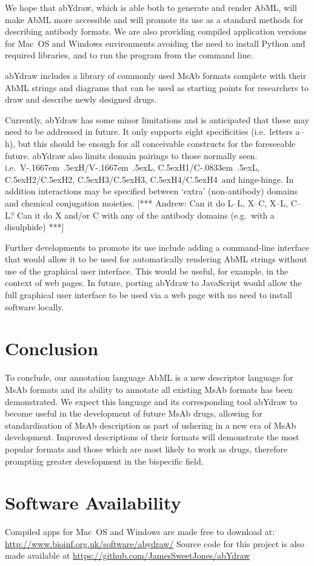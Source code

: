 \documentclass[a4]{article}
\newcommand{\VH}{\mbox{V\kern-.1667em \lower.5ex\hbox{\scriptsize H}}}
\newcommand{\VL}{\mbox{V\kern-.1667em \lower.5ex\hbox{\scriptsize L}}}
\newcommand{\VHVL}{\mbox{\VH/\VL}}
\newcommand{\CH}[1]{\mbox{C\lower.5ex\hbox{\scriptsize H}#1}}
\newcommand{\CL}{\mbox{C\kern-.0833em \lower.5ex\hbox{\scriptsize L}}}
\newcommand{\andrew}[1]{{\color{red} [*** Andrew: #1 ***]}}
\begin{document}
We hope that abYdraw, which is able both to generate and render AbML,
will make AbML more accessible and will promote its use as a standard
methods for describing antibody formats.  We are also providing
compiled application versions for Mac~OS and Windows environments
avoiding the need to install Python and required libraries, and to run
the program from the command line.

abYdraw includes a library of commonly used MsAb formats complete with their AbML
strings and diagrams that can be used as starting points for
researchers to draw and describe newly designed drugs.

Currently, abYdraw has some minor limitations and is anticipated that
these may need to be addressed in future. It only supports eight
specificities (i.e.\ letters a--h), but this should be enough for all
conceivable constructs for the foreseeable future.  abYdraw also
limits domain pairings to those normally seen. i.e.\ \VHVL,
\CH{1}/\CL, \CH{2}/\CH{2}, \CH{3}/\CH{3}, \CH{4}/\CH{4}\ and
hinge-hinge. In addition interactions may be specified between `extra'
(non-antibody) domains and chemical conjugation moieties.  \andrew{Can
  it do L--L, X--C, X--L, C--L? Can it do X and/or C with any of the
  antibody domains (e.g.\ with a disulphide)}

Further developments to promote its use include adding a command-line
interface that would allow it to be used for automatically rendering
AbML strings without use of the graphical user interface. This would
be useful, for example, in the context of web pages. In future,
porting abYdraw to JavaScript would allow the full graphical user
interface to be used via a web page with no need to install software
locally.


\section{Conclusion}

To conclude, our annotation language AbML is a new descriptor language
for MsAb formats and its ability to annotate all existing MsAb formats
has been demonstrated. We expect this language and its corresponding
tool abYdraw to become useful in the development of future MsAb drugs,
allowing for standardisation of MsAb description as part of ushering
in a new era of MsAb development. Improved descriptions of their
formats will demonstrate the most popular formats and those which are
most likely to work as drugs, therefore prompting greater development
in the bispecific field.  

\section{Software Availability}
Compiled apps for Mac~OS and Windows are made free to download at:
\url{http://www.bioinf.org.uk/software/abydraw/}
Source code for this project is also made available at
\url{https://github.com/JamesSweetJones/abYdraw}

 
\end{document}
